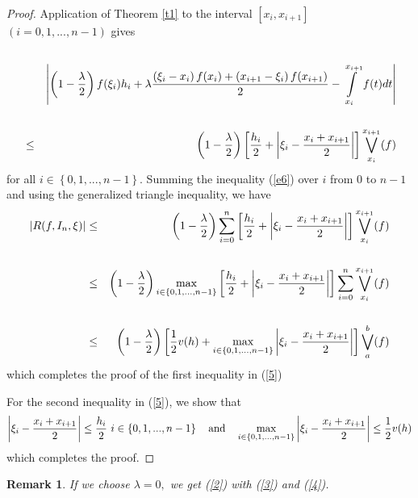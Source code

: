 \documentclass[
11pt,%
tightenlines,%
twoside,%
onecolumn,%
nofloats,%
nobibnotes,%
nofootinbib,%
superscriptaddress,%
noshowpacs,%
centertags]%
{revtex4}
\newtheorem{remark}{Remark} %
\begin{document}
\begin{proof}
Application of Theorem \ref{t1} to the interval $\left[ x_{i},x_{i+1}\right]
$ $\left( i=0,1,...,n-1\right) $ gives%
\begin{eqnarray}
&&  \label{e6} \\
&&\left\vert \left( 1-\frac{\lambda }{2}\right) f(\xi _{i})h_{i}+\lambda
\frac{\left( \xi _{i}-x_{i}\right) f(x_{i})+\left( x_{i+1}-\xi _{i}\right)
f(x_{i+1})}{2}-\int\limits_{x_{i}}^{x_{i+1}}f(t)dt\right\vert  \notag \\
&&  \notag \\
&\leq &\left( 1-\frac{\lambda }{2}\right) \left[ \frac{h_{i}}{2}+\left\vert
\xi _{i}-\frac{x_{i}+x_{i+1}}{2}\right\vert \right] \bigvee%
\limits_{x_{i}}^{x_{i+1}}(f)  \notag
\end{eqnarray}
for all $i\in \left\{ 0,1,...,n-1\right\} .$ Summing the inequality
(\ref{e6}) over $i$ from $0$ to $n-1$ and using the
generalized triangle inequality, we have%
\begin{eqnarray*}
\left\vert R(f,I_{n},\xi )\right\vert &\leq &\left( 1-\frac{\lambda }{2}%
\right) \sum\limits_{i=0}^{n}\left[ \frac{h_{i}}{2}+\left\vert \xi _{i}-%
\frac{x_{i}+x_{i+1}}{2}\right\vert \right] \bigvee%
\limits_{x_{i}}^{x_{i+1}}(f) \\
&& \\
&\leq &\left( 1-\frac{\lambda }{2}\right) \max_{i\in \left\{
0,1,...,n-1\right\} }\left[ \frac{h_{i}}{2}+\left\vert \xi _{i}-\frac{%
x_{i}+x_{i+1}}{2}\right\vert \right] \sum\limits_{i=0}^{n}\bigvee%
\limits_{x_{i}}^{x_{i+1}}(f) \\
&& \\
&\leq &\left( 1-\frac{\lambda }{2}\right) \left[ \frac{1}{2}v(h)+\max_{i\in
\left\{ 0,1,...,n-1\right\} }\left\vert \xi _{i}-\frac{x_{i}+x_{i+1}}{2}%
\right\vert \right] \bigvee\limits_{a}^{b}(f)
\end{eqnarray*}%
which completes the proof of the first inequality in (\ref{5})

For the second inequality in (\ref{5}), we show that%
$$
\left\vert \xi _{i}-\frac{x_{i}+x_{i+1}}{2}\right\vert \leq \frac{h_{i}}{2}%
\text{ }i\in \left\{ 0,1,...,n-1\right\} \quad {\text {and}}\quad
\max_{i\in \left\{ 0,1,...,n-1\right\} }\left\vert \xi _{i}-\frac{%
x_{i}+x_{i+1}}{2}\right\vert \leq \frac{1}{2}v(h)
$$
which completes the proof.
\end{proof}

\begin{remark}
If we choose $\lambda =0,$ we get (\ref{2}) with (\ref{3}) and (\ref{4}).
\end{remark}
\end{document}

